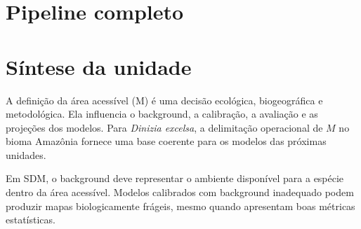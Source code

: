 \section{Pipeline completo}


\section{Síntese da unidade}

A definição da área acessível (M) é uma decisão ecológica, biogeográfica e metodológica. Ela influencia o background, a calibração, a avaliação e as projeções dos modelos. Para \textit{Dinizia excelsa}, a delimitação operacional de \(M\) no bioma Amazônia fornece uma base coerente para os modelos das próximas unidades.

\begin{conceito}[title={\faBook\quad Mensagem central}]
	Em SDM, o background deve representar o ambiente disponível para a espécie dentro da área acessível. Modelos calibrados com background inadequado podem produzir mapas biologicamente frágeis, mesmo quando apresentam boas métricas estatísticas.
\end{conceito}


